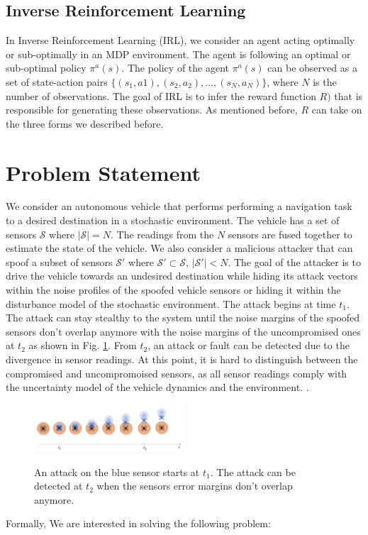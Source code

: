 \documentclass[conference]{IEEEtran}
\begin{document}
\subsection{Inverse Reinforcement Learning}
In Inverse Reinforcement Learning (IRL), we consider an agent acting optimally or sub-optimally in an MDP environment. The agent is following an optimal or sub-optimal policy $\pi^a(s)$. The policy of the agent $\pi^a(s)$ can be observed as a set of state-action pairs $\{(s_1,a1),(s_2,a_2), ...,(s_N,a_N)\}$, where $N$ is the number of observations. The goal of IRL is to infer the reward function $R)$ that is responsible for generating these observations. As mentioned before, $R$ can take on the three forms we described before.

\section{Problem Statement}\label{sec:problem}
We consider an autonomous vehicle that performs performing a navigation task to a desired destination in a stochastic environment. The vehicle has a set of sensors $\mathcal{S}$ where $|\mathcal{S}|=N$. The readings from the $N$ sensors are fused together to estimate the state of the vehicle. We also consider a malicious attacker that can spoof a subset of sensors $\mathcal{S'}$ where $\mathcal{S'} \subset \mathcal{S}$, $|\mathcal{S'}| < N$. The goal of the attacker is to drive the vehicle towards an undesired destination while hiding its attack vectors within the noise profiles of the spoofed vehicle sensors or hiding it within the disturbance model of the stochastic environment. The attack begins at time $t_1$. The attack can stay stealthy to the system until the noise margins of the spoofed sensors don't overlap anymore with the noise margins of the uncompromised ones at $t_2$ as shown in Fig. \ref{fig:sensor_spoofing}. From $t_2$, an attack or fault can be detected due to the divergence in sensor readings. At this point, it is hard to distinguish between the compromised and uncompromoised sensors, as all sensor readings comply with the uncertainty model of the vehicle dynamics and the environment. .
\begin{figure}[h]
\caption{An attack on the blue sensor starts at $t_1$. The attack can be detected at $t_2$ when the sensors error margins don't overlap anymore.}
\centering
\includegraphics[width=0.5\textwidth]{sensor_spoofing}
 \label{fig:sensor_spoofing}
\end{figure}
Formally, We are interested in solving the following problem:
\end{document}
